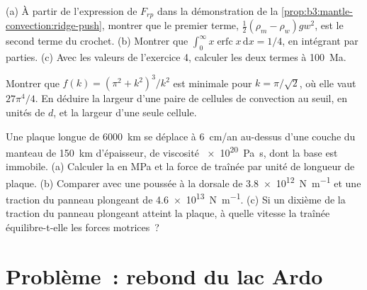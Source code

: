 \begin{exercise}[$\star\star\star$]\label{exo:b3:mantle-convection:10}
(a) À partir de l'expression de $F_{rp}$ dans la démonstration de
la \cref{prop:b3:mantle-convection:ridge-push}, montrer que le premier terme,
$\tfrac12(\rho_m - \rho_w)gw^2$, est le second terme du crochet. (b) Montrer que
$\int_0^\infty x\operatorname{erfc}x\,\mathrm dx = 1/4$, en intégrant par parties.
(c) Avec les valeurs de l'exercice 4, calculer les deux termes à \qty{100}{Ma}.
\end{exercise}

\begin{exercise}[$\star\star\star$]\label{exo:b3:mantle-convection:11}
Montrer que $f(k) = (\pi^2 + k^2)^3/k^2$ est minimale pour $k = \pi/\sqrt2$, où
elle vaut $27\pi^4/4$. En déduire la largeur d'une paire de cellules de convection au seuil,
en unités de $d$, et la largeur d'une seule cellule.
\end{exercise}

\begin{exercise}[$\star\star\star$]\label{exo:b3:mantle-convection:12}
Une plaque longue de \qty{6000}{km} se déplace à \qty{6}{cm/an} au-dessus
d'une couche du manteau de \qty{150}{km} d'épaisseur, de viscosité \qty{e20}{Pa.s}, dont la base est immobile. (a)
Calculer la  en \unit{MPa} et la force de traînée par unité de longueur de plaque.
(b) Comparer avec une poussée à la dorsale de \qty{3.8e12}{N.m^{-1}} et une traction du panneau plongeant de
\qty{4.6e13}{N.m^{-1}}. (c) Si un dixième de la traction du panneau plongeant atteint la plaque,
à quelle vitesse la traînée équilibre-t-elle les forces motrices~?
\end{exercise}

\section{Problème~: rebond du lac Ardo}

